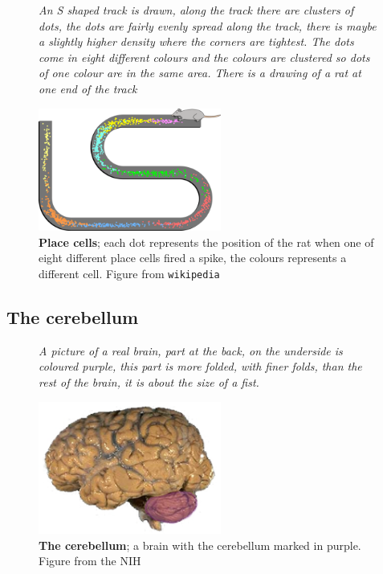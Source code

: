 \documentclass[12pt]{article}
\begin{document}
\begin{figure}[tbhp]
{\textsl{An S shaped track is drawn, along the track there are clusters of dots, the dots are fairly evenly spread along the track, there is maybe a slightly higher density where the corners are tightest. The dots come in eight different colours and the colours are clustered so dots of one colour are in the same area. There is a drawing of a rat at one end of the track}}
{
  \begin{center}
  \includegraphics[width=6cm]{place.png}
  \end{center}
  }
    \caption{\textbf{Place cells}; each dot represents the position of
    the rat when one of eight different place cells fired a spike, the
    colours represents a different cell. Figure from
    \texttt{wikipedia}\label{fig_place}}
\end{figure}


\subsection*{The cerebellum}


\begin{figure}[tbhp]
{\textsl{A picture of a real brain, part at the back, on the underside is coloured purple, this part is more folded, with finer folds, than the rest of the brain, it is about the size of a fist.}}
{
  \begin{center}
  \includegraphics[width=6cm]{cerebellum.png}
  \end{center}
  }
  \caption{\textbf{The cerebellum}; a brain with the cerebellum marked in purple. Figure from
    the NIH\label{fig_cerebellum}}
\end{figure}
\end{document}

